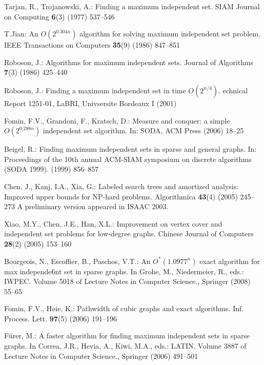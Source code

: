 \documentclass[runningheads]{llncs}
\begin{document}

\begin{thebibliography}{10}

Tarjan, R., Trojanowski, A.:
\newblock Finding a maximum independent set.
\newblock SIAM Journal on Computing \textbf{6}(3) (1977)  537--546

T.Jian:
\newblock An ${O}(2^{0.304n})$ algorithm for solving maximum independent set
  problem.
\newblock IEEE Transactions on Computers \textbf{35}(9) (1986)  847--851

Roboson, J.:
\newblock Algorithms for maximum independent sets.
\newblock Journal of Algorithms \textbf{7}(3) (1986)  425--440

Roboson, J.:
\newblock Finding a maximum independent set in time ${O}(2^{n/4})$.
echnical {R}eport 1251-01, LaBRI, Univsersite Bordeaux I (2001)

Fomin, F.V., Grandoni, F., Kratsch, D.:
\newblock Measure and conquer: a simple ${O}(2^{0.288n})$ independent set
  algorithm.
\newblock In: SODA, ACM Press (2006)  18--25

Beigel, R.:
\newblock Finding maximum independent sets in sparse and general graphs.
\newblock In: Proceedings of the 10th annual ACM-SIAM symposium on discrete
  algorithms (SODA 1999). (1999)  856--857

Chen, J., Kanj, I.A., Xia, G.:
\newblock Labeled search trees and amortized analysis: Improved upper bounds
  for {NP}-hard problems.
\newblock Algorithmica \textbf{43}(4) (2005)  245--273 A preliminary version
  appeared in ISAAC 2003.

Xiao, M.Y., Chen, J.E., Han, X.L.:
\newblock Improvement on vertex cover and independent set problems for
  low-degree graphs.
\newblock Chinese Journal of Computers \textbf{28}(2) (2005)  153--160

Bourgeois, N., Escoffier, B., Paschos, V.T.:
\newblock An ${O}^*(1.0977^n)$ exact algorithm for max independe6nt set in
  sparse graphs.
\newblock In Grohe, M., Niedermeier, R., eds.: IWPEC. Volume 5018 of Lecture
  Notes in Computer Science., Springer (2008)  55--65

Fomin, F.V., H{\o}ie, K.:
\newblock Pathwidth of cubic graphs and exact algorithms.
\newblock Inf. Process. Lett. \textbf{97}(5) (2006)  191--196

F{\"u}rer, M.:
\newblock A faster algorithm for finding maximum independent sets in sparse
  graphs.
\newblock In Correa, J.R., Hevia, A., Kiwi, M.A., eds.: LATIN. Volume 3887 of
  Lecture Notes in Computer Science., Springer (2006)  491--501


\end{thebibliography}
\end{document}
